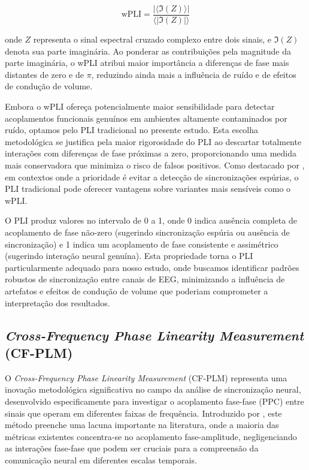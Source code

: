 \[
\text{wPLI} = \frac{|\langle \Im(Z) \rangle|}{\langle |\Im(Z)| \rangle}
\]

onde \(Z\) representa o sinal espectral cruzado complexo entre dois sinais, e \(\Im(Z)\) denota sua parte imaginária. Ao ponderar as contribuições pela magnitude da parte imaginária, o wPLI atribui maior importância a diferenças de fase mais distantes de zero e de \(\pi\), reduzindo ainda mais a influência de ruído e de efeitos de condução de volume.

Embora o wPLI ofereça potencialmente maior sensibilidade para detectar acoplamentos funcionais genuínos em ambientes altamente contaminados por ruído, optamos pelo PLI tradicional no presente estudo. Esta escolha metodológica se justifica pela maior rigorosidade do PLI ao descartar totalmente interações com diferenças de fase próximas a zero, proporcionando uma medida mais conservadora que minimiza o risco de falsos positivos. Como destacado por , em contextos onde a prioridade é evitar a detecção de sincronizações espúrias, o PLI tradicional pode oferecer vantagens sobre variantes mais sensíveis como o wPLI.

O PLI produz valores no intervalo de 0 a 1, onde 0 indica ausência completa de acoplamento de fase não-zero (sugerindo sincronização espúria ou ausência de sincronização) e 1 indica um acoplamento de fase consistente e assimétrico (sugerindo interação neural genuína). Esta propriedade torna o PLI particularmente adequado para nosso estudo, onde buscamos identificar padrões robustos de sincronização entre canais de EEG, minimizando a influência de artefatos e efeitos de condução de volume que poderiam comprometer a interpretação dos resultados.

\subsection{\textit{Cross-Frequency Phase Linearity Measurement} (CF-PLM)}
O \textit{Cross-Frequency Phase Linearity Measurement} (CF-PLM) representa uma inovação metodológica significativa no campo da análise de sincronização neural, desenvolvido especificamente para investigar o acoplamento fase-fase (PPC) entre sinais que operam em diferentes faixas de frequência. Introduzido por , este método preenche uma lacuna importante na literatura, onde a maioria das métricas existentes concentra-se no acoplamento fase-amplitude, negligenciando as interações fase-fase que podem ser cruciais para a compreensão da comunicação neural em diferentes escalas temporais.

